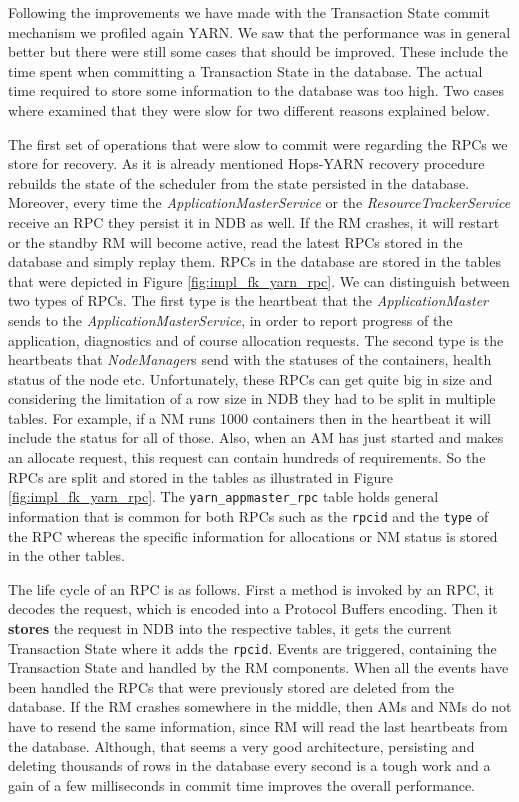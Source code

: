 Following the improvements we have made with the Transaction State
commit mechanism we profiled again YARN. We saw that the performance
was in general better but there were still some cases that should be
improved. These include the time spent when committing a Transaction
State in the database. The actual time required to store some
information to the database was too high. Two cases where examined that
they were slow for two different reasons explained below.

The first set of operations that were slow to commit were regarding
the RPCs we store for recovery. As it is already mentioned Hops-YARN
recovery procedure rebuilds the state of the scheduler from the state
persisted in the database. Moreover, every time the
\emph{ApplicationMasterService} or the \emph{ResourceTrackerService}
receive an RPC they persist it in NDB as well. If the RM crashes, it
will restart or the standby RM will become active, read the latest
RPCs stored in the database and simply replay them. RPCs in the
database are stored in the tables that were depicted in Figure
\ref{fig:impl_fk_yarn_rpc}. We can distinguish between two types of
RPCs. The first type is the heartbeat that the
\emph{ApplicationMaster} sends to the \emph{ApplicationMasterService},
in order to report progress of the application, diagnostics and of
course allocation requests. The second type is the heartbeats that
\emph{NodeManager}s send with the statuses of the containers, health
status of the node etc. Unfortunately, these RPCs can get quite big
in size and considering the limitation of a row size in NDB they had
to be split in multiple tables. For example, if a NM runs 1000
containers then in the heartbeat it will include the status for all of
those. Also, when an AM has just started and makes an allocate
request, this request can contain hundreds of requirements. So the
RPCs are split and stored in the tables as illustrated in Figure
\ref{fig:impl_fk_yarn_rpc}. The \texttt{yarn\_appmaster\_rpc} table
holds general information that is common for both RPCs such as the
\texttt{rpcid} and the \texttt{type} of the RPC whereas the
specific information for allocations or NM status is stored in the
other tables.

The life cycle of an RPC is as follows. First a method is invoked by
an RPC, it decodes the request, which is encoded into a Protocol
Buffers encoding. Then it \textbf{stores} the request in NDB into the
respective tables, it gets the current Transaction State where it adds
the \texttt{rpcid}. Events are triggered, containing the
Transaction State and handled by the RM components. When all the
events have been handled the RPCs that were previously stored are deleted
from the database. If the RM crashes somewhere in the middle, then AMs
and NMs do not have to resend the same information, since RM will read
the last heartbeats from the database. Although, that seems a very
good architecture, persisting and deleting thousands of rows in the
database every second is a tough work and a gain of a few milliseconds
in commit time improves the overall performance.

